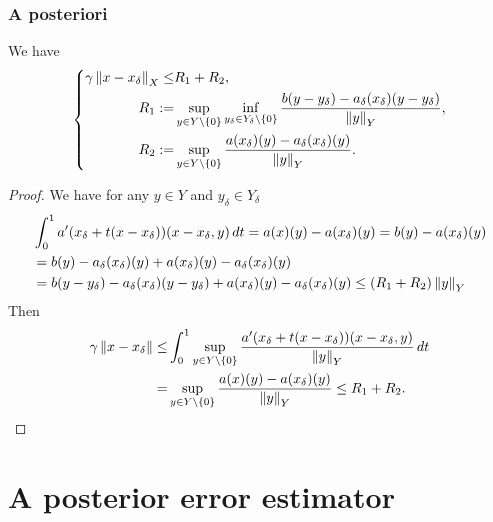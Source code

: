 \documentclass[english,12pt,a4paper]{article}
\begin{document}
\subsubsection{A posteriori}
%
\begin{theorem}\label{thm:}
We have
%
\begin{equation}\label{eq:}
%
\left\{
\begin{aligned}
\gamma \norm{x-x_{\delta}}_X \le& R_1 + R_2,\\
 R_1 :=& \sup_{y\in Y\setminus\Set{0}}\inf_{y_{\delta}\in Y_{\delta}\setminus\Set{0}}\frac{b(y-y_{\delta}) - a_{\delta}(x_{\delta})(y-y_{\delta})}{\norm{y}_Y} ,\\ 
 R_2 :=&  \sup_{y\in Y\setminus\Set{0}}\frac{a(x_{\delta})(y)-a_{\delta}(x_{\delta})(y)}{\norm{y}_Y}.
\end{aligned}
\right.
%
\end{equation}
%
\end{theorem}
%
\begin{proof}
We have for any $y\in Y$ and $y_{\delta}\in Y_{\delta}$
%
\begin{align*}
&\int_0^1a'(x_{\delta}+t(x-x_{\delta}))(x-x_{\delta},y)\,dt = a(x)(y) - a(x_{\delta})(y)
= b(y) - a(x_{\delta})(y)\\ 
&= b(y) - a_{\delta}(x_{\delta})(y) + a(x_{\delta})(y)-a_{\delta}(x_{\delta})(y)\\
&= b(y-y_{\delta}) - a_{\delta}(x_{\delta})(y-y_{\delta}) + a(x_{\delta})(y)-a_{\delta}(x_{\delta})(y) \le \left(R_1+R_2\right)\left\|y\right\|_{Y}
\end{align*}
%
%
Then
%
\begin{align*}
\gamma \left\|x-x_{\delta}\right\| \le& \int_0^1\sup_{y\in Y\setminus\left\{0\right\}}\frac{a'(x_{\delta}+t(x-x_{\delta}))(x-x_{\delta},y)}{\left\|y\right\|_Y}\,dt\\ =& 
\sup_{y\in Y\setminus\left\{0\right\}}\frac{a(x)(y) - a(x_{\delta})(y)}{\left\|y\right\|_Y} \le R_1 + R_2.
\end{align*}
%
\end{proof}
%
%
\section{A posterior error estimator}\label{sec:}
%
%
\end{document}
